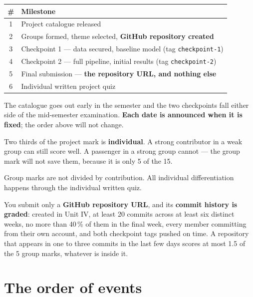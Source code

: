 \documentclass[11pt]{article}
\begin{document}
\begin{center}
\begin{tabular}{@{}cl@{}}
\toprule
\textbf{\#} & \textbf{Milestone}\\
\midrule
1 & Project catalogue released\\
2 & Groups formed, theme selected, \textbf{GitHub repository created}\\
3 & Checkpoint 1 --- data secured, baseline model (tag \texttt{checkpoint-1})\\
4 & Checkpoint 2 --- full pipeline, initial results (tag \texttt{checkpoint-2})\\
5 & Final submission --- \textbf{the repository URL, and nothing else}\\
6 & Individual written project quiz\\
\bottomrule
\end{tabular}
\end{center}

\noindent The catalogue goes out early in the semester and the two checkpoints
fall either side of the mid-semester examination. \textbf{Each date is announced
when it is fixed}; the order above will not change.

\begin{keyidea}
Two thirds of the project mark is \textbf{individual}. A strong contributor in a
weak group can still score well. A passenger in a strong group cannot --- the
group mark will not save them, because it is only 5 of the 15.

Group marks are not divided by contribution. All individual differentiation
happens through the individual written quiz.

You submit only a \textbf{GitHub repository URL}, and its \textbf{commit history
is graded}: created in Unit IV, at least 20 commits across at least six distinct
weeks, no more than 40\,\% of them in the final week, every member committing
from their own account, and both checkpoint tags pushed on time. A repository
that appears in one to three commits in the last few days scores at most 1.5 of
the 5 group marks, whatever is inside it.
\end{keyidea}

\newpage
\section{The order of events}
\end{document}
